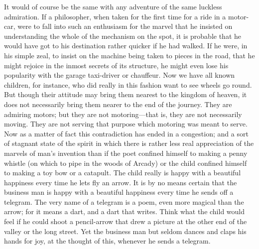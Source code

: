 \documentclass{book}
\begin{document}
It would of course be the same with any adventure of the same luckless admiration. If a philosopher, when taken for the first time for a ride in a motor-car, were to fall into such an enthusiasm for the marvel that he insisted on understanding the whole of the mechanism on the spot, it is probable that he would have got to his destination rather quicker if he had walked. If he were, in his simple zeal, to insist on the machine being taken to pieces in the road, that he might rejoice in the inmost secrets of its structure, he might even lose his popularity with the garage taxi-driver or chauffeur. Now we have all known children, for instance, who did really in this fashion want to see wheels go round. But though their attitude may bring them nearest to the kingdom of heaven, it does not necessarily bring them nearer to the end of the journey. They are admiring motors; but they are not motoring—that is, they are not necessarily moving. They are not serving that purpose which motoring was meant to serve. Now as a matter of fact this contradiction has ended in a congestion; and a sort of stagnant state of the spirit in which there is rather less real appreciation of the marvels of man’s invention than if the poet confined himself to making a penny whistle (on which to pipe in the woods of Arcady) or the child confined himself to making a toy bow or a catapult. The child really is happy with a beautiful happiness every time he lets fly an arrow. It is by no means certain that the business man is happy with a beautiful happiness every time he sends off a telegram. The very name of a telegram is a poem, even more magical than the arrow; for it means a dart, and a dart that writes. Think what the child would feel if he could shoot a pencil-arrow that drew a picture at the other end of the valley or the long street. Yet the business man but seldom dances and claps his hands for joy, at the thought of this, whenever he sends a telegram.
\end{document}
